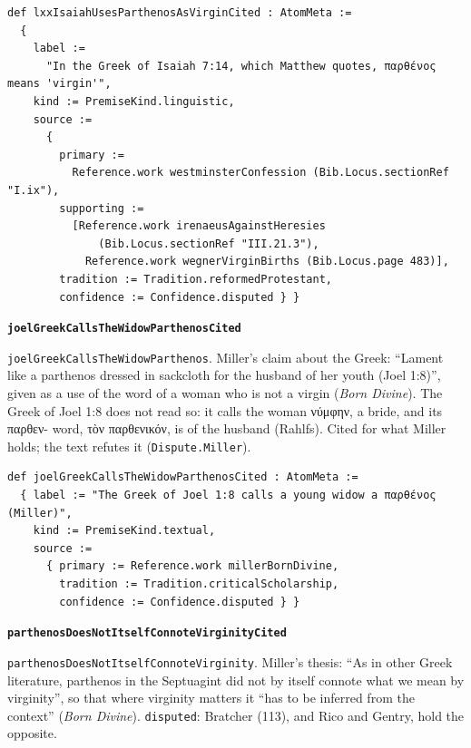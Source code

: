 \documentclass[11pt]{article}
\begin{document}
{\small\begin{verbatim}
def lxxIsaiahUsesParthenosAsVirginCited : AtomMeta :=
  {
    label :=
      "In the Greek of Isaiah 7:14, which Matthew quotes, παρθένος means 'virgin'",
    kind := PremiseKind.linguistic,
    source :=
      {
        primary :=
          Reference.work westminsterConfession (Bib.Locus.sectionRef "I.ix"),
        supporting :=
          [Reference.work irenaeusAgainstHeresies
              (Bib.Locus.sectionRef "III.21.3"),
            Reference.work wegnerVirginBirths (Bib.Locus.page 483)],
        tradition := Tradition.reformedProtestant,
        confidence := Confidence.disputed } }
\end{verbatim}}
\par\medskip\noindent\textbf{\texttt{joel\allowbreak{}Greek\allowbreak{}Calls\allowbreak{}The\allowbreak{}Widow\allowbreak{}Parthenos\allowbreak{}Cited}}\par\nobreak\noindent
\texttt{joel\allowbreak{}Greek\allowbreak{}Calls\allowbreak{}The\allowbreak{}Widow\allowbreak{}Parthenos}. Miller’s claim about the Greek: “Lament like a parthenos dressed in sackcloth for the husband of her youth (Joel 1:8)”, given as a use of the word of a woman who is not a virgin (\emph{Born Divine}). The Greek of Joel 1:8 does not read so: it calls the woman νύμφην, a bride, and its παρθεν- word, τὸν παρθενικόν, is of the husband (Rahlfs). Cited for what Miller holds; the text refutes it (\texttt{Dispute.Miller}).

{\small\begin{verbatim}
def joelGreekCallsTheWidowParthenosCited : AtomMeta :=
  { label := "The Greek of Joel 1:8 calls a young widow a παρθένος (Miller)",
    kind := PremiseKind.textual,
    source :=
      { primary := Reference.work millerBornDivine,
        tradition := Tradition.criticalScholarship,
        confidence := Confidence.disputed } }
\end{verbatim}}
\par\medskip\noindent\textbf{\texttt{parthenos\allowbreak{}Does\allowbreak{}Not\allowbreak{}Itself\allowbreak{}Connote\allowbreak{}Virginity\allowbreak{}Cited}}\par\nobreak\noindent
\texttt{parthenos\allowbreak{}Does\allowbreak{}Not\allowbreak{}Itself\allowbreak{}Connote\allowbreak{}Virginity}. Miller’s thesis: “As in other Greek literature, parthenos in the Septuagint did not by itself connote what we mean by virginity”, so that where virginity matters it “has to be inferred from the context” (\emph{Born Divine}). \texttt{disputed}: Bratcher (113), and Rico and Gentry, hold the opposite.
\end{document}
